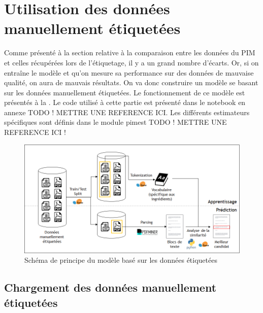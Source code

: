     \chapter{Utilisation des données manuellement étiquetées}

    Comme présenté à la section relative à la comparaison entre les données du PIM et celles récupérées lors de l'étiquetage, il y a un grand nombre d'écarts.
    Or, si on entraîne le modèle et qu'on mesure sa performance sur des données de mauvaise qualité, on aura de mauvais résultats.
    On va donc construire un modèle se basant sur les données manuellement étiquetées.
    Le fonctionnement de ce modèle est présentés à la .
    Le code utilisé à cette partie est présenté dans le notebook en annexe TODO ! METTRE UNE REFERENCE ICI.
    Les différents estimateurs spécifiques sont définis dans le module pimest TODO ! METTRE UNE REFERENCE ICI !
    
    \begin{figure}[htbp]
        \begin{center}
        \includegraphics[width=0.9\linewidth]{img/ground_truth_model.png}
        \end{center}
        \caption{Schéma de principe du modèle basé sur les données étiquetées}
        \label{fig:ground_truth_model}
    \end{figure}     

        \section{Chargement des données manuellement étiquetées}

